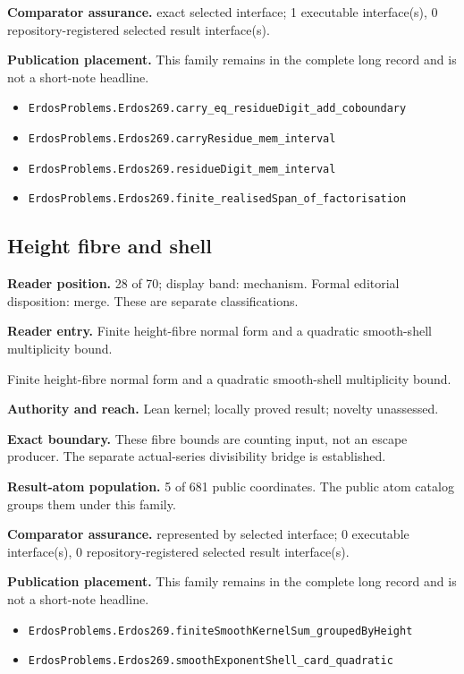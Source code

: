 \documentclass[11pt]{article}
\begin{document}
\textbf{Comparator assurance.} exact selected interface; 1 executable interface(s), 0 repository-registered selected result interface(s).

\textbf{Publication placement.} This family remains in the complete long record and is not a short-note headline.

\begin{itemize}
  \item \nolinkurl{ErdosProblems.Erdos269.carry_eq_residueDigit_add_coboundary}
  \item \nolinkurl{ErdosProblems.Erdos269.carryResidue_mem_interval}
  \item \nolinkurl{ErdosProblems.Erdos269.residueDigit_mem_interval}
  \item \nolinkurl{ErdosProblems.Erdos269.finite_realisedSpan_of_factorisation}
\end{itemize}

\subsection{Height fibre and shell}
\textbf{Reader position.} 28 of 70; display band: mechanism.  Formal editorial disposition: merge.  These are separate classifications.

\textbf{Reader entry.} Finite height-fibre normal form and a quadratic smooth-shell multiplicity bound.

Finite height-fibre normal form and a quadratic smooth-shell multiplicity bound.

\textbf{Authority and reach.} Lean kernel; locally proved result; novelty unassessed.

\textbf{Exact boundary.} These fibre bounds are counting input, not an escape producer. The separate actual-series divisibility bridge is established.

\textbf{Result-atom population.} 5 of 681 public coordinates. The public atom catalog groups them under this family.

\textbf{Comparator assurance.} represented by selected interface; 0 executable interface(s), 0 repository-registered selected result interface(s).

\textbf{Publication placement.} This family remains in the complete long record and is not a short-note headline.

\begin{itemize}
  \item \nolinkurl{ErdosProblems.Erdos269.finiteSmoothKernelSum_groupedByHeight}
  \item \nolinkurl{ErdosProblems.Erdos269.smoothExponentShell_card_quadratic}
\end{itemize}
\end{document}
